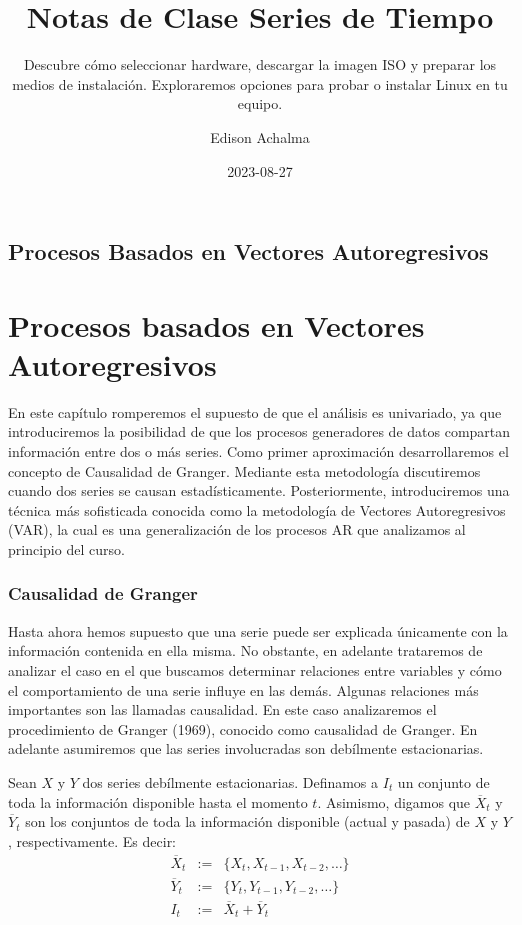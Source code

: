 \documentclass[
  a4paper,
]{article}
\title{Notas de Clase Series de Tiempo}
\subtitle{Descubre cómo seleccionar hardware, descargar la imagen ISO y
preparar los medios de instalación. Exploraremos opciones para probar o
instalar Linux en tu equipo.}
\author{Edison Achalma}
\date{2023-08-27}
\begin{document}
\maketitle

\section{Procesos Basados en Vectores
Autoregresivos}\label{procesos-basados-en-vectores-autoregresivos}

\chapter{Procesos basados en Vectores Autoregresivos}

En este capítulo romperemos el supuesto de que el análisis es
univariado, ya que introduciremos la posibilidad de que los procesos
generadores de datos compartan información entre dos o más series. Como
primer aproximación desarrollaremos el concepto de Causalidad de
Granger. Mediante esta metodología discutiremos cuando dos series se
causan estadísticamente. Posteriormente, introduciremos una técnica más
sofisticada conocida como la metodología de Vectores Autoregresivos
(VAR), la cual es una generalización de los procesos AR que analizamos
al principio del curso.

\subsection{Causalidad de Granger}\label{causalidad-de-granger}

Hasta ahora hemos supuesto que una serie puede ser explicada únicamente
con la información contenida en ella misma. No obstante, en adelante
trataremos de analizar el caso en el que buscamos determinar relaciones
entre variables y cómo el comportamiento de una serie influye en las
demás. Algunas relaciones más importantes son las llamadas causalidad.
En este caso analizaremos el procedimiento de Granger (1969), conocido
como causalidad de Granger. En adelante asumiremos que las series
involucradas son debílmente estacionarias.

Sean \(X\) y \(Y\) dos series debílmente estacionarias. Definamos a
\(I_t\) un conjunto de toda la información disponible hasta el momento
\(t\). Asimismo, digamos que \(\overline{X}_t\) y \(\overline{Y}_t\) son
los conjuntos de toda la información disponible (actual y pasada) de
\(X\) y \(Y\), respectivamente. Es decir: \begin{eqnarray}
    \overline{X}_t & := & \{ X_t, X_{t-1}, X_{t-2}, \ldots \} \\
    \overline{Y}_t & := & \{ Y_t, Y_{t-1}, Y_{t-2}, \ldots \} \\
    I_t & := & \overline{X}_t + \overline{Y}_t
\end{eqnarray}
\end{document}
